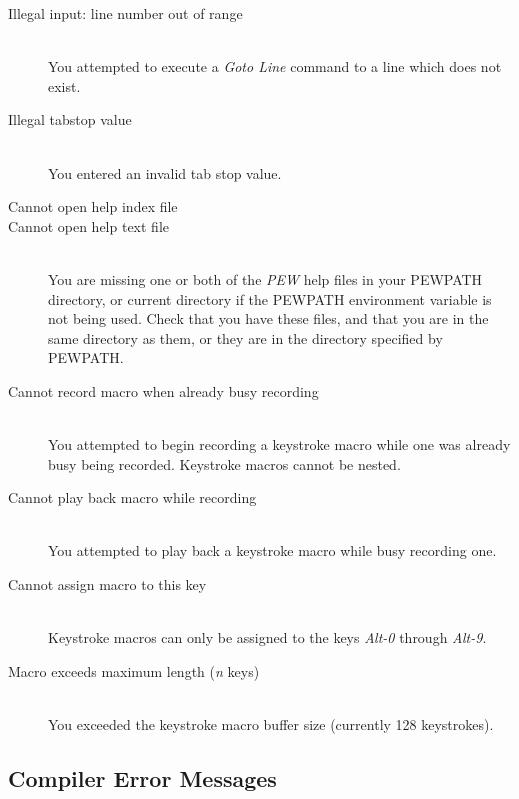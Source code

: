 \begin{description}
\item[Illegal input: line number out of range]\mbox{}\\
You attempted to execute a {\em Goto Line} command to a line which
does not exist.

\item[Illegal tabstop value]\mbox{}\\
You entered an invalid tab stop value.

\item[Cannot open help index file]
\item[Cannot open help text file]\mbox{}\\
You are missing one or both of the {\em PEW} help files in your
PEWPATH directory, or current directory if the PEWPATH environment
variable is not being used. Check that you have these files, and that
you are in the same directory as them, or they are in the directory
specified by PEWPATH.

\item[Cannot record macro when already busy recording]\mbox{}\\
You attempted to begin recording a keystroke macro while one was
already busy being recorded. Keystroke macros cannot be nested.

\item[Cannot play back macro while recording]\mbox{}\\
You attempted to play back a keystroke macro while busy recording
one.

\item[Cannot assign macro to this key]\mbox{}\\
Keystroke macros can only be assigned to the keys {\em Alt-0}
through {\em Alt-9}.

\item[Macro exceeds maximum length ({\em n} keys)]\mbox{}\\
You exceeded the keystroke macro buffer size (currently 128
keystrokes).
\end{description}

\subsection[Compiler Error Messages]{Compiler Error Messages}

